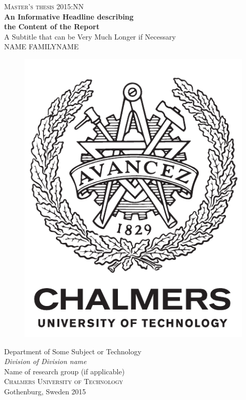 \newpage
\thispagestyle{empty}
\begin{center}
	\textsc{\large Master's thesis 2015:NN}\\[4cm]		%
	\textbf{\Large An Informative Headline describing\\ the Content of the Report} \\[1cm]
	{\large A Subtitle that can be Very Much Longer if Necessary}\\[1cm]
	{\large NAME FAMILYNAME}
	
	\vfill	
	\begin{figure}[H]
	\centering
	\includegraphics[width=0.2\pdfpagewidth]{figure/auxiliary/logo_eng.pdf} \\	
	\end{figure}	\vspace{5mm}	
	
	Department of Some Subject or Technology \\
	\emph{Division of Division name}\\
	Name of research group (if applicable)\\
	\textsc{Chalmers University of Technology} \\
	Gothenburg, Sweden 2015 \\
\end{center}


